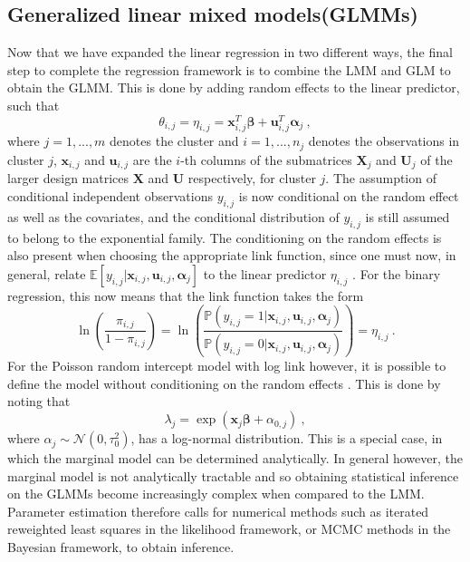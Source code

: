 \subsection{Generalized linear mixed models(GLMMs)}
\label{sec:GLMM}
Now that we have expanded the linear regression in two different ways, the final step to complete the regression framework is to combine the LMM and GLM to obtain the GLMM. This is done by adding random effects to the linear predictor, such that
\begin{equation}
    \theta_{i, j} = \eta_{i, j} = \mathbf{x}_{i, j}^T\boldsymbol{\beta} + \mathbf{u}_{i, j}^T \boldsymbol{\alpha}_j \ , %
\end{equation}
where $j =1, ..., m$ denotes the cluster and $i=1, ..., n_j$ denotes the observations in cluster $j$, $\mathbf{x}_{i, j}$ and $\mathbf{u}_{i, j}$ are the $i$-th columns of the submatrices $\mathbf{X}_{j}$ and $\mathbf{U}_{j}$ of the larger design matrices $\mathbf{X}$ and $\mathbf{U}$ respectively, for cluster $j$.
The assumption of conditional independent observations $y_{i, j}$ is now conditional on the random effect as well as the covariates, and the conditional distribution of $y_{i, j}$ is still assumed to belong to the exponential family. The conditioning on the random effects is also present when choosing the appropriate link function, since one must now, in general, relate $\mathbb{E}[y_{i, j} \lvert \mathbf{x}_{i, j}, \mathbf{u}_{i, j}, \boldsymbol{\alpha}_{j}]$ to the linear predictor $\eta_{i, j}$ \citep{GLMM_book}. For the binary regression, this now means that the link function takes the form 
\begin{equation}
    \ln \left(\frac{\pi_{i, j}}{1- \pi_{i, j}}\right) = \ln \left(\frac{\mathbb{P}(y_{i, j} = 1 \lvert \mathbf{x}_{i, j}, \mathbf{u}_{i, j}, \boldsymbol{\alpha}_{j})}{\mathbb{P}(y_{i, j} = 0 \lvert \mathbf{x}_{i, j}, \mathbf{u}_{i, j}, \boldsymbol{\alpha}_{j})}\right) = \eta_{i, j}  \ .
\end{equation}
For the Poisson random intercept model with log link however, it is possible to define the model without conditioning on the random effects \citep{GLMM_book}. This is done by noting that
\begin{equation}
    \lambda_j = \exp(\mathbf{x}_j\boldsymbol{\beta} + \alpha_{0, j}) \ ,
\end{equation}
where $\alpha_j \sim \mathcal{N}(0, \tau_0^2)$, has a log-normal distribution. This is a special case, in which the marginal model can be determined analytically. In general however, the marginal model is not analytically tractable and so obtaining statistical inference on the GLMMs become increasingly complex when compared to the LMM. Parameter estimation therefore calls for numerical methods such as iterated reweighted least squares in the likelihood framework, or MCMC methods in the Bayesian framework, to obtain inference.

